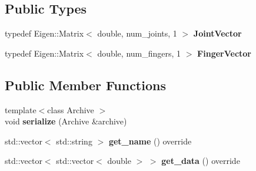 \subsection*{Public Types}
\begin{DoxyCompactItemize}
\item 
\mbox{\label{structrobot__interfaces_1_1NFingerObservation_a59675be5ce3ffe4c61fb1e88d131d31a}} 
typedef Eigen\+::\+Matrix$<$ double, num\+\_\+joints, 1 $>$ {\bfseries Joint\+Vector}
\item 
\mbox{\label{structrobot__interfaces_1_1NFingerObservation_aa97c4d41b53b370f0e7301a051f0e60a}} 
typedef Eigen\+::\+Matrix$<$ double, num\+\_\+fingers, 1 $>$ {\bfseries Finger\+Vector}
\end{DoxyCompactItemize}
\subsection*{Public Member Functions}
\begin{DoxyCompactItemize}
\item 
\mbox{\label{structrobot__interfaces_1_1NFingerObservation_a66ebefed2f36a1c538cf4c0524931e60}} 
{\footnotesize template$<$class Archive $>$ }\\void {\bfseries serialize} (Archive \&archive)
\item 
\mbox{\label{structrobot__interfaces_1_1NFingerObservation_a0fd596a36ab38bdb148b64497499f32b}} 
std\+::vector$<$ std\+::string $>$ {\bfseries get\+\_\+name} () override
\item 
\mbox{\label{structrobot__interfaces_1_1NFingerObservation_af8b4692b935585942a51b9342605b712}} 
std\+::vector$<$ std\+::vector$<$ double $>$ $>$ {\bfseries get\+\_\+data} () override
\end{DoxyCompactItemize}
